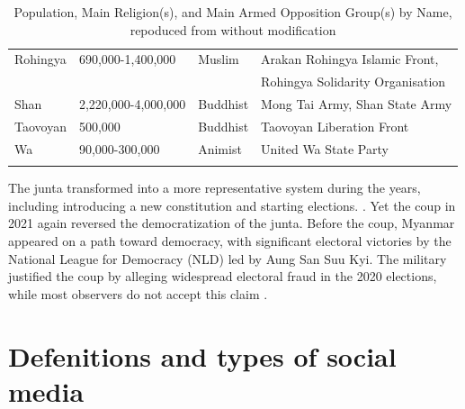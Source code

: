 \documentclass[man,floatsintext]{apa7}
\begin{document}
\begin{longtable}{@{}lllp{5.5cm}@{}}
Rohingya& 690,000-1,400,000   & Muslim             & Arakan Rohingya Islamic Front, \\
        &                     &                    & Rohingya Solidarity Organisation \\
Shan    & 2,220,000-4,000,000 & Buddhist           & Mong Tai Army, Shan State Army \\
Taovoyan& 500,000             & Buddhist           & Taovoyan Liberation Front \\
Wa      & 90,000-300,000      & Animist            & United Wa State Party \\
\bottomrule

\caption{Population, Main Religion(s), and Main Armed Opposition Group(s) by Name, repoduced from \textcite[34]{smithEthnicGroupsBurma1994} without modification}
\label{grouptable}

\end{longtable}

The junta transformed into a more representative system during the years, including introducing a new constitution and starting elections. \autocite[276-285]{aung-thwinHistoryMyanmarAncient2012}. Yet the coup in 2021 again reversed the democratization of the junta. Before the coup, Myanmar appeared on a path toward democracy, with significant electoral victories by the National League for Democracy (NLD) led by Aung San Suu Kyi. The military justified the coup by alleging widespread electoral fraud in the 2020 elections, while most observers do not accept this claim \autocite{ganesanMyanmar2021Military2023}.

\section{Defenitions and types of social media}
\end{document}
